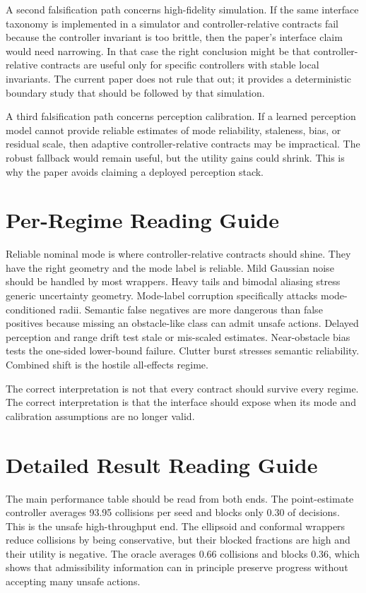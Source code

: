 \documentclass{article}
\begin{document}
A second falsification path concerns high-fidelity simulation. If the same interface taxonomy is implemented in a simulator and controller-relative contracts fail because the controller invariant is too brittle, then the paper's interface claim would need narrowing. In that case the right conclusion might be that controller-relative contracts are useful only for specific controllers with stable local invariants. The current paper does not rule that out; it provides a deterministic boundary study that should be followed by that simulation.

A third falsification path concerns perception calibration. If a learned perception model cannot provide reliable estimates of mode reliability, staleness, bias, or residual scale, then adaptive controller-relative contracts may be impractical. The robust fallback would remain useful, but the utility gains could shrink. This is why the paper avoids claiming a deployed perception stack.

\section{Per-Regime Reading Guide}

Reliable nominal mode is where controller-relative contracts should shine. They have the right geometry and the mode label is reliable. Mild Gaussian noise should be handled by most wrappers. Heavy tails and bimodal aliasing stress generic uncertainty geometry. Mode-label corruption specifically attacks mode-conditioned radii. Semantic false negatives are more dangerous than false positives because missing an obstacle-like class can admit unsafe actions. Delayed perception and range drift test stale or mis-scaled estimates. Near-obstacle bias tests the one-sided lower-bound failure. Clutter burst stresses semantic reliability. Combined shift is the hostile all-effects regime.

The correct interpretation is not that every contract should survive every regime. The correct interpretation is that the interface should expose when its mode and calibration assumptions are no longer valid.

\section{Detailed Result Reading Guide}

The main performance table should be read from both ends. The point-estimate controller averages 93.95 collisions per seed and blocks only 0.30 of decisions. This is the unsafe high-throughput end. The ellipsoid and conformal wrappers reduce collisions by being conservative, but their blocked fractions are high and their utility is negative. The oracle averages 0.66 collisions and blocks 0.36, which shows that admissibility information can in principle preserve progress without accepting many unsafe actions.
\end{document}
